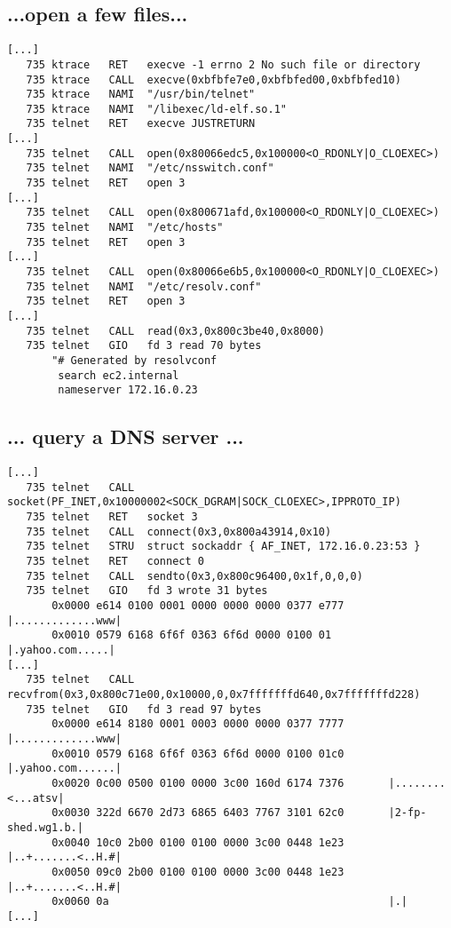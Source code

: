 \documentclass[xga]{xdvislides}
\newcommand{\smallish}{\fontsize{16}{16}\selectfont}
\begin{document}
\subsection{...open a few files...}
\smallish
\begin{verbatim}
[...]
   735 ktrace   RET   execve -1 errno 2 No such file or directory
   735 ktrace   CALL  execve(0xbfbfe7e0,0xbfbfed00,0xbfbfed10)
   735 ktrace   NAMI  "/usr/bin/telnet"
   735 ktrace   NAMI  "/libexec/ld-elf.so.1"
   735 telnet   RET   execve JUSTRETURN
[...]
   735 telnet   CALL  open(0x80066edc5,0x100000<O_RDONLY|O_CLOEXEC>)
   735 telnet   NAMI  "/etc/nsswitch.conf"
   735 telnet   RET   open 3
[...]
   735 telnet   CALL  open(0x800671afd,0x100000<O_RDONLY|O_CLOEXEC>)
   735 telnet   NAMI  "/etc/hosts"
   735 telnet   RET   open 3
[...]
   735 telnet   CALL  open(0x80066e6b5,0x100000<O_RDONLY|O_CLOEXEC>)
   735 telnet   NAMI  "/etc/resolv.conf"
   735 telnet   RET   open 3
[...]
   735 telnet   CALL  read(0x3,0x800c3be40,0x8000)
   735 telnet   GIO   fd 3 read 70 bytes
       "# Generated by resolvconf
        search ec2.internal
        nameserver 172.16.0.23
\end{verbatim}
\Normalsize

\subsection{... query a DNS server ...}
\smallish
\begin{verbatim}
[...]
   735 telnet   CALL  socket(PF_INET,0x10000002<SOCK_DGRAM|SOCK_CLOEXEC>,IPPROTO_IP)
   735 telnet   RET   socket 3
   735 telnet   CALL  connect(0x3,0x800a43914,0x10)
   735 telnet   STRU  struct sockaddr { AF_INET, 172.16.0.23:53 }
   735 telnet   RET   connect 0
   735 telnet   CALL  sendto(0x3,0x800c96400,0x1f,0,0,0)
   735 telnet   GIO   fd 3 wrote 31 bytes
       0x0000 e614 0100 0001 0000 0000 0000 0377 e777       |.............www|
       0x0010 0579 6168 6f6f 0363 6f6d 0000 0100 01         |.yahoo.com.....|
[...]
   735 telnet   CALL  recvfrom(0x3,0x800c71e00,0x10000,0,0x7fffffffd640,0x7fffffffd228)
   735 telnet   GIO   fd 3 read 97 bytes
       0x0000 e614 8180 0001 0003 0000 0000 0377 7777       |.............www|
       0x0010 0579 6168 6f6f 0363 6f6d 0000 0100 01c0       |.yahoo.com......|
       0x0020 0c00 0500 0100 0000 3c00 160d 6174 7376       |........<...atsv|
       0x0030 322d 6670 2d73 6865 6403 7767 3101 62c0       |2-fp-shed.wg1.b.|
       0x0040 10c0 2b00 0100 0100 0000 3c00 0448 1e23       |..+.......<..H.#|
       0x0050 09c0 2b00 0100 0100 0000 3c00 0448 1e23       |..+.......<..H.#|
       0x0060 0a                                            |.|
[...]
\end{verbatim}
\Normalsize
\end{document}
